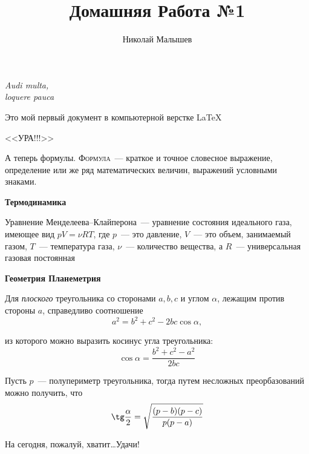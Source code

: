 \documentclass[12pt]{article}
\title{Домашняя Работа №1}
\author{Николай Малышев}
\date{}
\begin{document}
	\maketitle
	\begin{flushright}
		{\itshape Audi multa,\\loquere pauca}
	\end{flushright}
	\vspace{20pt}
	Это мой первый документ в компьютерной верстке \LaTeX 
	\begin{center}
		\sffamily\LARGE{<<УРА!!!>>}
	\end{center}
	А теперь формулы. {\scshape Формула}~--- краткое и точное словесное выражение, определение или же ряд  математических величин, выражений условными знаками.
	
	\vspace{15pt}
	\hspace{28pt}
	{\bfseries \large Термодинамика} \par
	
	Уравнение Менделеева--Клайперона~--- уравнение состояния идеального газа, имеющее вид $pV = \nu RT$, где $p$~--- это давление, $V$~--- это объем, занимаемый газом, $T$~--- температура газа, $\nu$~--- количество вещества, а $R$~--- универсальная газовая постоянная
	
	\vspace{15pt}
	\hspace{28pt}
	{\bfseries \large Геометрия \hfill Планеметрия} \par
	
	Для {\slshape плоского} треугольника со сторонами $a, b, c$ и углом $\alpha$, лежащим против стороны $a$, справедливо соотношение
	$$ a^2 = b^2 + c^2 - 2bc \cos\alpha, $$ \par
	из которого можно выразить косинус угла треугольника:
	$$
	\cos\alpha = {\frac{b^2 + c^2 - a^2}{2bc}}
	$$ \par
	Пусть $p$~--- полупериметр треугольника, тогда путем несложных преорбазований можно получить, что
	$$
	\tg\frac{\alpha}{2} = \sqrt{\frac{(p - b)(p - c)}{p(p - a)}}
	$$
	\vspace{1cm}
	\begin{flushleft}
		На сегодня, пожалуй, хватит\ldots Удачи!
	\end{flushleft}
\end{document}
